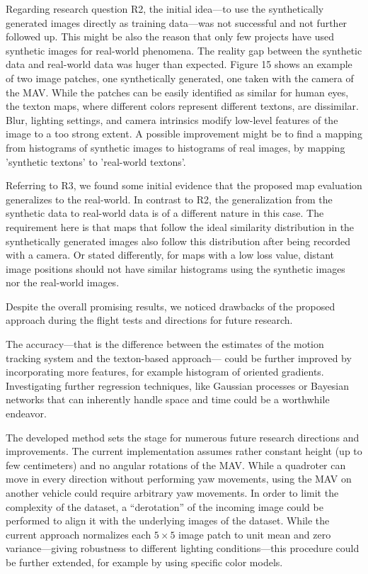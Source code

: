 \documentclass{report}
\begin{document}
Regarding research question R2, the initial idea---to use the
synthetically generated images directly as training data---was not
successful and not further followed up. This might be also the reason
that only few projects have used synthetic images for real-world
phenomena. The reality gap between the synthetic data and real-world
data was huger than expected. Figure 15 shows an example of two image
patches, one synthetically generated, one taken with the camera of the
MAV. While the patches can be easily identified as similar for human
eyes, the texton maps, where different colors represent different
textons, are dissimilar. Blur, lighting settings, and camera
intrinsics modify low-level features of the image to a too strong
extent. A possible improvement might be to find a mapping from
histograms of synthetic images to histograms of real images, by
mapping 'synthetic textons' to 'real-world textons'.

Referring to R3, we found some initial evidence that the proposed map
evaluation generalizes to the real-world. In contrast to R2, the
generalization from the synthetic data to real-world data is of a
different nature in this case. The requirement here is that maps that
follow the ideal similarity distribution in the synthetically
generated images also follow this distribution after being recorded
with a camera. Or stated differently, for maps with a low loss value,
distant image positions should not have similar histograms using the
synthetic images nor the real-world images.

Despite the overall promising results, we noticed drawbacks of the
proposed approach during the flight tests and directions for future
research.

The accuracy---that is the difference between the estimates of the
motion tracking system and the texton-based approach--- could be
further improved by incorporating more features, for example histogram
of oriented gradients. Investigating further regression techniques,
like Gaussian processes or Bayesian networks that can inherently
handle space and time could be a worthwhile endeavor.

The developed method sets the stage for numerous future research
directions and improvements. The current implementation assumes rather
constant height (up to few centimeters) and no angular rotations of
the MAV. While a quadroter can move in every direction without
performing yaw movements, using the MAV on another vehicle could
require arbitrary yaw movements. In order to limit the complexity of
the dataset, a ``derotation'' of the incoming image could be performed
to align it with the underlying images of the dataset. While the
current approach normalizes each $5\times5$ image patch to unit mean
and zero variance---giving robustness to different lighting
conditions---this procedure could be further extended, for example by
using specific color models.
\end{document}
